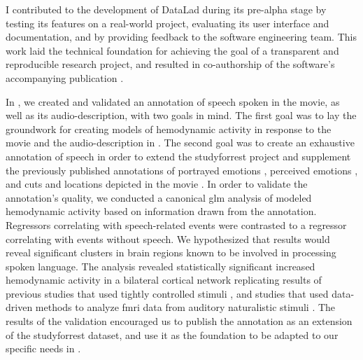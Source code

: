 


I contributed to the development of DataLad during its pre-alpha stage by
testing its features on a real-world project, evaluating its user interface and
documentation, and by providing feedback to the software engineering team.
This work laid the technical foundation for achieving the goal of a transparent
and reproducible research project, and resulted in co-authorship of the
software's accompanying publication \citep[cf.][]{halchenko2021datalad}.



In \citet{haeusler2021speechanno}, we created and validated an annotation of
speech spoken in the movie, as well as its audio-description, with two goals in
mind.
The first goal was to lay the groundwork for creating models of hemodynamic
activity in response to the movie and the audio-description in
\citet{haeusler2022processing}.
The second goal was to create an exhaustive annotation of speech in order to
extend the studyforrest project and supplement the previously published
annotations of portrayed emotions \citep{labs2015portrayed}, perceived emotions
\citep{lettieri2019emotionotopy}, and cuts and locations depicted in the movie
\citep{haeusler2016cutanno}.
In order to validate the annotation's quality, we conducted a canonical \ac{glm}
analysis of modeled hemodynamic activity based on information drawn from the
annotation.
Regressors correlating with speech-related events were contrasted to a regressor
correlating with events without speech.
We hypothesized that results would reveal significant clusters in brain regions
known to be involved in processing spoken language.
The analysis revealed statistically significant increased hemodynamic activity
in a bilateral cortical network replicating results of previous studies that
used tightly controlled stimuli \citep[s.][for reviews]{friederici2011brain,
hickok2007cortical,price2012twentyyears}, and studies that used data-driven
methods to analyze \ac{fmri} data from auditory naturalistic stimuli
\citep{honey2012not, lerner2011topographic, silbert2014coupled}.
The results of the validation encouraged us to publish the annotation as an
extension of the studyforrest dataset, and use it as the foundation to be
adapted to our specific needs in \citet{haeusler2022processing}.


